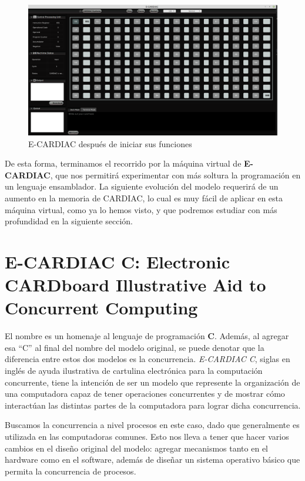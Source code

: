 \documentclass[letterpaper,12pt,oneside]{book}
\begin{document}
	\begin{figure}[H]
			\includegraphics[scale=0.28]{media/ECARDIAC/ECARDIAC_P2.png}
			\caption{E-CARDIAC después de iniciar sus funciones}
			\label{fig:enceCardiac}
			
	\end{figure}
	
	
	De esta forma, terminamos el recorrido por la máquina virtual de \textbf{E-CARDIAC}, que nos permitirá experimentar con más soltura la programación 
	en un
	lenguaje ensamblador. La siguiente evolución del modelo requerirá de un aumento en la memoria de CARDIAC, lo cual es muy fácil
	de aplicar en esta  máquina virtual, como ya lo hemos visto, y que podremos estudiar con más profundidad en la siguiente
	sección.


	\clearpage	
		
	\section{E-CARDIAC C: Electronic CARDboard Illustrative Aid to Concurrent Computing}
		
	El nombre es un homenaje al lenguaje de programación \textbf{C}. Además, al agregar esa ``C'' al final del nombre del modelo original,
	se puede denotar que la diferencia entre estos dos modelos es la concurrencia. \textit{E-CARDIAC C}, siglas en inglés de ayuda ilustrativa de cartulina electrónica para
	la computación concurrente, tiene la intención de ser un modelo que represente la organización de una computadora
	capaz de tener operaciones concurrentes
	y de mostrar cómo interactúan las distintas partes de la computadora para lograr dicha concurrencia.
 
    Buscamos la concurrencia a nivel procesos
	en este caso, dado que generalmente es utilizada en las computadoras comunes. Esto nos lleva a tener que hacer varios cambios en el diseño original
	del modelo: agregar mecanismos tanto en el hardware como en el software, además de diseñar un sistema operativo básico que permita la concurrencia 
	de procesos.
	
\end{document}
